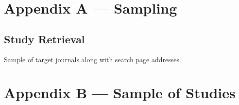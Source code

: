 \documentclass[nobib]{tufte-handout}
\begin{document}
\begin{appendices}

\begin{refsection}

\section{Appendix A --- Sampling}
\label{sec:sampling}

\subsection{Study Retrieval}
\begin{table}
  \centering
  \sffamily
  \begin{small}
    
  \end{small}
  \label{tab:journal_search}
  \caption{Sample of target journals along with search page addresses.}
\end{table}

\section{Appendix B --- Sample of Studies}
\label{sec:sample_of_studies}

\nocite{*}

\printbibliography[heading=none]

\end{refsection}

\end{appendices}

\end{document}
